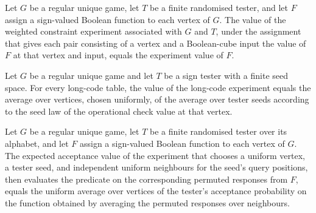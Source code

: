 \begin{theorem}
\label{FABL.RegularUniqueGame.longCodeWeightedExperiment_value}
\leanok
{}
Let $G$ be a regular unique game, let $T$ be a finite randomised tester, and let $F$
assign a sign-valued Boolean function to each vertex of $G$. The value of the weighted
constraint experiment associated with $G$ and $T$, under the assignment that gives each
pair consisting of a vertex and a Boolean-cube input the value of $F$ at that vertex and
input, equals the experiment value of $F$.
\end{theorem}

\begin{theorem}
\label{FABL.RegularUniqueGame.longCodeExperimentValue_eq_iteratedOperational}
\leanok
{}
Let $G$ be a regular unique game and let $T$ be a sign tester with a finite seed space.
For every long-code table, the value of the long-code experiment equals the average over
vertices, chosen uniformly, of the average over tester seeds according to the seed law
of the operational check value at that vertex.
\end{theorem}

\begin{theorem}
\label{FABL.RegularUniqueGame.longCodeExperimentValue_eq_longCodeValue}
\leanok
{}
Let $G$ be a regular unique game, let $T$ be a finite randomised tester over its
alphabet, and let $F$ assign a sign-valued Boolean function to each vertex of $G$. The
expected acceptance value of the experiment that chooses a uniform vertex, a tester
seed, and independent uniform neighbours for the seed's query positions, then evaluates
the predicate on the corresponding permuted responses from $F$, equals the uniform
average over vertices of the tester's acceptance probability on the function obtained by
averaging the permuted responses over neighbours.
\end{theorem}

